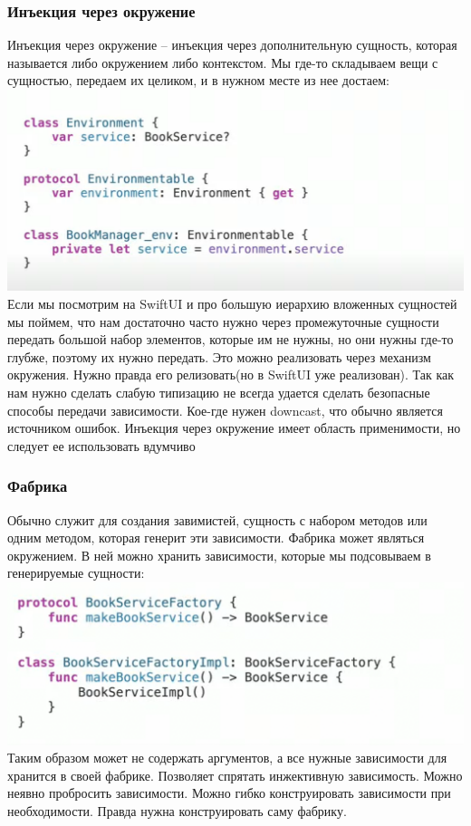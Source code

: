 \documentclass{article}
\begin{document}
    \subsubsection{Инъекция через окружение}
    Инъекция через окружение -- инъекция через дополнительную сущность, которая называется либо окружением либо контекстом. Мы где-то складываем вещи с сущностью, передаем их целиком, и в нужном месте из нее достаем:
    \newline
    \includegraphics[scale = 0.5]{pic/Снимок экрана 2023-07-31 в 01.19.06.png}
    \newline
    Если мы посмотрим на SwiftUI и про большую иерархию вложенных сущностей мы поймем, что нам достаточно часто нужно через промежуточные сущности передать большой набор элементов, которые им не нужны, но они нужны где-то глубже, поэтому их нужно передать. Это можно реализовать через механизм окружения. Нужно правда его релизовать(но в SwiftUI уже реализован). Так как нам нужно сделать слабую типизацию не всегда удается сделать безопасные способы передачи зависимости. Кое-где нужен downcast, что обычно является источником ошибок. 
    \newline
    Инъекция через окружение имеет область применимости, но следует ее использовать вдумчиво
    \subsubsection{Фабрика}
    Обычно служит для создания завимистей, сущность с набором методов или одним методом, которая генерит эти зависимости. Фабрика может являться окружением. В ней можно хранить зависимости, которые мы подсовываем в генерируемые сущности:
    \newline
    \includegraphics[scale = 0.3]{pic/Снимок экрана 2023-07-31 в 01.27.13.png}
    \newline
    Таким образом  может не содержать аргументов, а все нужные зависимости для  хранится в своей фабрике. Позволяет спрятать инжективную зависимость. 
    \newline
    Можно неявно пробросить зависимости. Можно гибко конструировать зависимости при необходимости. Правда нужна конструировать саму фабрику. 
\end{document}
